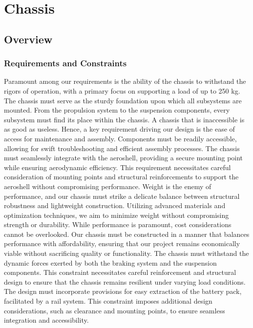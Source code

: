 
\section{Chassis}


\subsection{Overview}
\subsubsection{Requirements and Constraints}
Paramount among our requirements is the ability of the chassis to withstand the rigors of operation, with a primary focus on supporting a load of up to 250 kg. The chassis must serve as the sturdy foundation upon which all subsystems are mounted. From the propulsion system to the suspension components, every subsystem must find its place within the chassis. A chassis that is inaccessible is as good as useless. Hence, a key requirement driving our design is the ease of access for maintenance and assembly. Components must be readily accessible, allowing for swift troubleshooting and efficient assembly processes. The chassis must seamlessly integrate with the aeroshell, providing a secure mounting point while ensuring aerodynamic efficiency. This requirement necessitates careful consideration of mounting points and structural reinforcements to support the aeroshell without compromising performance. Weight is the enemy of performance, and our chassis must strike a delicate balance between structural robustness and lightweight construction. Utilizing advanced materials and optimization techniques, we aim to minimize weight without compromising strength or durability. While performance is paramount, cost considerations cannot be overlooked. Our chassis must be constructed in a manner that balances performance with affordability, ensuring that our project remains economically viable without sacrificing quality or functionality. The chassis must withstand the dynamic forces exerted by both the braking system and the suspension components. This constraint necessitates careful reinforcement and structural design to ensure that the chassis remains resilient under varying load conditions. The design must incorporate provisions for easy extraction of the battery pack, facilitated by a rail system. This constraint imposes additional design considerations, such as clearance and mounting points, to ensure seamless integration and accessibility.

